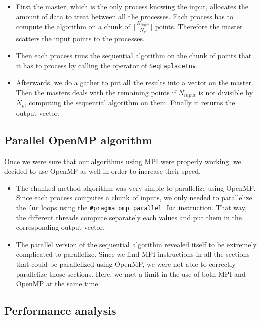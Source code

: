 \documentclass[11pt,a4paper]{article}
\begin{document}
\begin{itemize}

\item First the master, which is the only process knowing the input, allocates the amount of data to treat between all the processes. Each process has to compute the algorithm on a chunk of $\lfloor \frac{N_{input}}{N_p} \rfloor$ points. Therefore the master scatters the input points to the processes. 

\item Then each process runs the sequential algorithm on the chunk of points that it has to process by calling the operator of \verb_SeqLaplaceInv_. 

\item Afterwards, we do a gather to put all the results into a vector on the master. Then the masters deals with the remaining points if $N_{input}$ is not divisible by $N_p$, computing the sequential algorithm on them. Finally it returns the output vector. 

\end{itemize}

\subsection{Parallel OpenMP algorithm}
Once we were sure that our algorithms using MPI were properly working, we decided to use OpenMP as well in order to increase their speed. 

\begin{itemize}

\item The chunked method algorithm was very simple to parallelize using OpenMP. Since each process computes a chunk of inputs, we only needed to parallelize the \verb_for_ loops using the \verb_#pragma omp parallel for_ instruction. That way, the different threads compute separately each values and put them in the corresponding output vector.

\item The parallel version of the sequential algorithm revealed itself to be extremely complicated to parallelize. Since we find MPI instructions in all the sections that could be parallelized using OpenMP, we were not able to correctly parallelize those sections. Here, we met a limit in the use of both MPI and OpenMP at the same time.

\end{itemize}

\subsection{Performance analysis}
\end{document}
